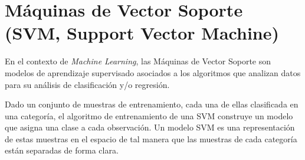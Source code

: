 \documentclass[12pt,spanish,a4paper]{article}
\numberwithin{equation}{section}
\begin{document}
%
% 

\newpage
\pagestyle{plain}
\setcounter{tocdepth}{5}
\tableofcontents


\newpage
\listoffigures


\newpage
\listoftables


\newpage
{}


\newpage
\pagestyle{fancy}

\renewcommand*{\headrulewidth}{0,4pt}
\renewcommand*{\footrulewidth}{0,4pt}

\fancyhead[HC]{}
\fancyfoot[FC]{}

\hypertarget{maquinas-de-vector-soporte-svm-support-vector-machine}{%
\section{Máquinas de Vector Soporte (SVM, Support Vector
Machine)}\label{maquinas-de-vector-soporte-svm-support-vector-machine}}

En el contexto de \emph{Machine Learning}, las Máquinas de Vector
Soporte son modelos de aprendizaje supervisado asociados a los
algoritmos que analizan datos para su análisis de clasificación y/o
regresión.

Dado un conjunto de muestras de entrenamiento, cada una de ellas
clasificada en una categoría, el algoritmo de entrenamiento de una SVM
construye un modelo que asigna una clase a cada observación. Un modelo
SVM es una representación de estas muestras en el espacio de tal manera
que las muestras de cada categoría están separadas de forma clara.
\end{document}
